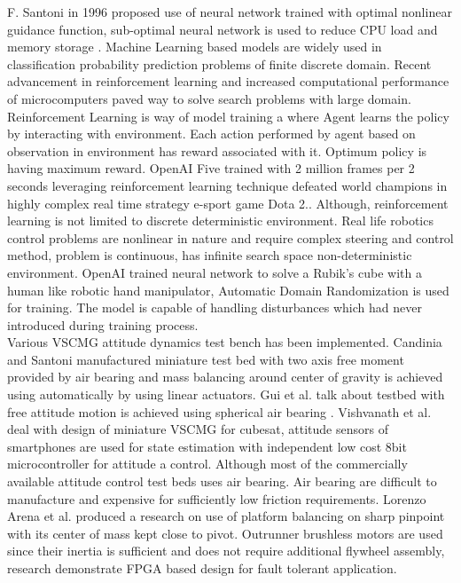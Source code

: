 \noindent F. Santoni in 1996 proposed use of neural network trained with optimal nonlinear guidance function, sub-optimal neural network is used to reduce CPU load and memory storage \cite{Santoni1996}. Machine Learning based models are widely used in classification probability prediction problems of finite discrete domain. Recent advancement in reinforcement learning and increased computational performance of microcomputers paved way to solve search problems with large domain. Reinforcement Learning is way of model training a where Agent learns the policy by interacting with environment. Each action performed by agent based on observation in environment has reward associated with it. Optimum policy is having maximum reward. OpenAI Five trained with 2 million frames per 2 seconds leveraging reinforcement learning technique defeated world champions in highly complex real time strategy e-sport game Dota 2.\cite{openai2019dota}. Although, reinforcement learning is not limited to discrete deterministic environment. Real life robotics control problems are nonlinear in nature and require complex steering and control method, problem is continuous, has infinite search space non-deterministic environment. OpenAI trained neural network to solve a Rubik’s cube with a human like robotic hand manipulator, Automatic Domain Randomization is used for training. The model is capable of handling disturbances which had never introduced during training process. \cite{openai2019solving}\\

\noindent%
Various VSCMG attitude dynamics test bench has been implemented.  Candinia and Santoni manufactured miniature test bed with two axis free moment provided by air bearing and mass balancing around center of gravity is achieved using automatically by using linear actuators. \cite{Candinia2012} Gui et al. talk about testbed with free attitude motion is achieved using spherical air bearing \cite{Gui2015}. Vishvanath et al. deal with design of miniature VSCMG for cubesat, attitude sensors of smartphones are used for state estimation with independent low cost 8bit microcontroller for attitude a control.\cite{2015arXiv150903677P}  Although most of the commercially available attitude control test beds uses air bearing. Air bearing are difficult to manufacture and expensive for sufficiently low friction requirements.
Lorenzo Arena et al. produced a research on use of platform balancing on sharp pinpoint with its center of mass kept close to pivot. Outrunner brushless motors are used since their inertia is sufficient and does not require additional flywheel assembly, research demonstrate FPGA based design for fault tolerant application. \cite{doi:10.1061/(ASCE)AS.1943-5525.0000754}


